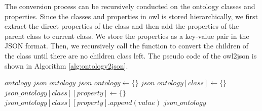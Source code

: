 The conversion process can be recursively conducted on the ontology classes and properties. Since the classes and properties in owl is stored hierarchically,
we first extract the direct properties of the class and then add the properties of the parent class to current class. 
We store the properties as a key-value pair in the JSON format.
 Then, we recursively call the function to convert the children of the class until there are no children class left.
The pseudo code of the owl2json is shown in Algorithm \ref{alg:ontology2json}.
\raggedright
\begin{algorithm}
    \begin{algorithmic}[1]
        \label{alg:ontology2json}
        \Require $ontology$
        \Ensure $json\_ontology$
        \State $json\_ontology \leftarrow \{\}$ 
                \State $json\_ontology[class] \leftarrow \{\}$
                    \State $json\_ontology[class][property] \leftarrow \{\}$
                        \State $json\_ontology[class][property].append(value)$
                    \EndFor
                \EndFor
            \EndFor
            \Return $json\_ontology$
        \EndFunction



\end{algorithmic}
\end{algorithm}
